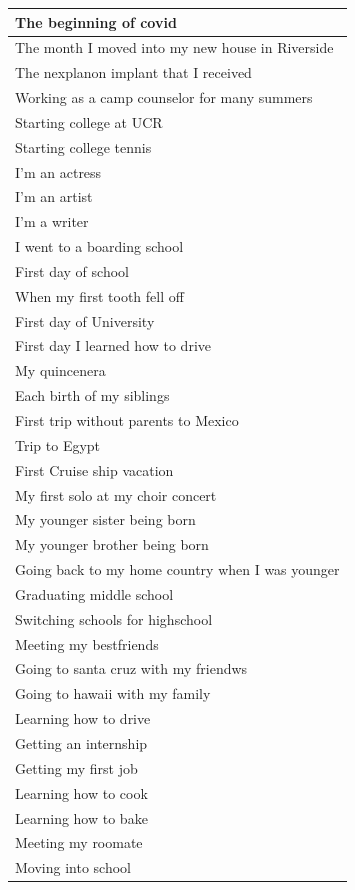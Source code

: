\documentclass[
  .7em,
  letterpaper,
  DIV=11,
  numbers=noendperiod]{scrartcl}
\begin{document}
\begin{table}
\begin{tabular}{l}
\hline
The beginning of covid\\
\hline
The month I moved into my new house in Riverside\\
\hline
The nexplanon implant that I received\\
\hline
Working as a camp counselor for many summers\\
\hline
Starting college at UCR\\
\hline
Starting college tennis\\
\hline
I'm an actress\\
\hline
I'm an artist\\
\hline
I'm a writer\\
\hline
I went to a boarding school\\
\hline
First day of school\\
\hline
When my first tooth fell off\\
\hline
First day of University\\
\hline
First day I learned how to drive\\
\hline
My quincenera\\
\hline
Each birth of my siblings\\
\hline
First trip without parents to Mexico\\
\hline
Trip to Egypt\\
\hline
First Cruise ship vacation\\
\hline
My first solo at my choir concert\\
\hline
My younger sister being born\\
\hline
My younger brother being born\\
\hline
Going back to my home country when I was younger\\
\hline
Graduating middle school\\
\hline
Switching schools for highschool\\
\hline
Meeting my bestfriends\\
\hline
Going to santa cruz with my friendws\\
\hline
Going to hawaii with my family\\
\hline
Learning how to drive\\
\hline
Getting an internship\\
\hline
Getting my first job\\
\hline
Learning how to cook\\
\hline
Learning how to bake\\
\hline
Meeting my roomate\\
\hline
Moving into school\\

\end{tabular}
\end{table}
\end{document}
